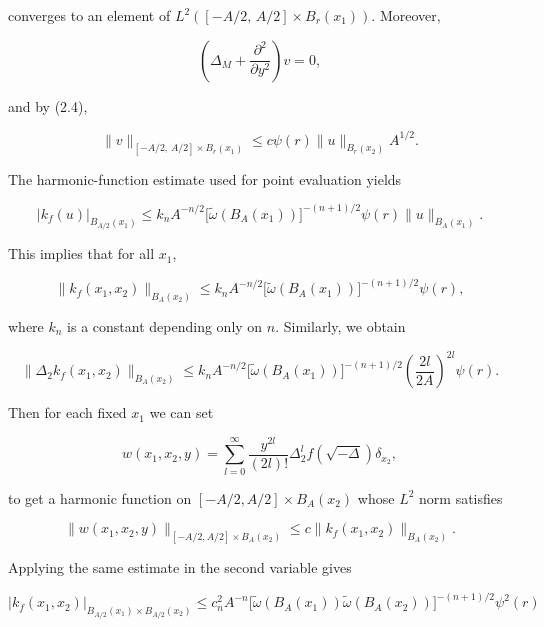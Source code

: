 converges to an element of $L^2([ -A/2,\, A/2]\times B_r(x_1))$. Moreover,

\begin{equation}\tag{2.6}
\left(\Delta_M + \frac{\partial^2}{\partial y^2}\right)v = 0,
\end{equation}

and by (2.4),

\begin{equation}\tag{2.7}
\|v\|_{[-A/2,\,A/2]\times B_r(x_1)} \le c\psi(r)\|u\|_{B_r(x_2)}A^{1/2}.
\end{equation}

The harmonic-function estimate used for point evaluation yields

\begin{equation}\tag{2.8}
\left|k_f(u)\right|_{B_{A/2}(x_1)}
\le k_nA^{-n/2}\bigl[\tilde{\omega}(B_A(x_1))\bigr]^{-(n+1)/2}\psi(r)\|u\|_{B_A(x_1)}.
\end{equation}

This implies that for all $x_1$,

\begin{equation}\tag{2.9}
\|k_f(x_1,x_2)\|_{B_A(x_2)}
\le k_nA^{-n/2}\bigl[\tilde{\omega}(B_A(x_1))\bigr]^{-(n+1)/2}\psi(r),
\end{equation}

where $k_n$ is a constant depending only on $n$. Similarly, we obtain

\begin{equation}\tag{2.10}
\|\Delta_2 k_f(x_1,x_2)\|_{B_A(x_2)}
\le k_nA^{-n/2}\bigl[\tilde{\omega}(B_A(x_1))\bigr]^{-(n+1)/2}
\left(\frac{2l}{2A}\right)^{2l}\psi(r).
\end{equation}

Then for each fixed $x_1$ we can set

\begin{equation}\tag{2.11}
w(x_1,x_2,y)=\sum_{l=0}^{\infty}\frac{y^{2l}}{(2l)!}\Delta_2^l f(\sqrt{-\Delta})\delta_{x_2},
\end{equation}

to get a harmonic function on $[-A/2,A/2]\times B_A(x_2)$ whose $L^2$ norm satisfies

\begin{equation}\tag{2.12}
\|w(x_1,x_2,y)\|_{[-A/2,A/2]\times B_A(x_2)}
\le c\|k_f(x_1,x_2)\|_{B_A(x_2)}.
\end{equation}

Applying the same estimate in the second variable gives

\begin{equation}\tag{2.13}
\left|k_f(x_1,x_2)\right|_{B_{A/2}(x_1)\times B_{A/2}(x_2)}
\le c_n^2A^{-n}\bigl[\tilde{\omega}(B_A(x_1))\tilde{\omega}(B_A(x_2))\bigr]^{-(n+1)/2}\psi^2(r)
\end{equation}

